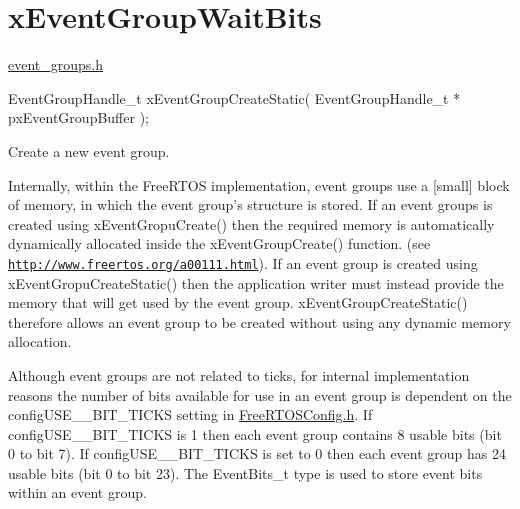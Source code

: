 \hypertarget{group__xEventGroupWaitBits}{\section{x\-Event\-Group\-Wait\-Bits}
\label{group__xEventGroupWaitBits}
}
\hyperlink{event__groups_8h}{event\-\_\-groups.\-h} 
\begin{DoxyPre}
 EventGroupHandle\_t xEventGroupCreateStatic( EventGroupHandle\_t * pxEventGroupBuffer );
 \end{DoxyPre}


Create a new event group.

Internally, within the Free\-R\-T\-O\-S implementation, event groups use a \mbox{[}small\mbox{]} block of memory, in which the event group's structure is stored. If an event groups is created using x\-Event\-Gropu\-Create() then the required memory is automatically dynamically allocated inside the x\-Event\-Group\-Create() function. (see \href{http://www.freertos.org/a00111.html}{\tt http\-://www.\-freertos.\-org/a00111.\-html}). If an event group is created using x\-Event\-Gropu\-Create\-Static() then the application writer must instead provide the memory that will get used by the event group. x\-Event\-Group\-Create\-Static() therefore allows an event group to be created without using any dynamic memory allocation.

Although event groups are not related to ticks, for internal implementation reasons the number of bits available for use in an event group is dependent on the config\-U\-S\-E\-\_\-\_\-\-B\-I\-T\-\_\-\-T\-I\-C\-K\-S setting in \hyperlink{FreeRTOSConfig_8h}{Free\-R\-T\-O\-S\-Config.\-h}. If config\-U\-S\-E\-\_\-\_\-\-B\-I\-T\-\_\-\-T\-I\-C\-K\-S is 1 then each event group contains 8 usable bits (bit 0 to bit 7). If config\-U\-S\-E\-\_\-\_\-\-B\-I\-T\-\_\-\-T\-I\-C\-K\-S is set to 0 then each event group has 24 usable bits (bit 0 to bit 23). The Event\-Bits\-\_\-t type is used to store event bits within an event group.


